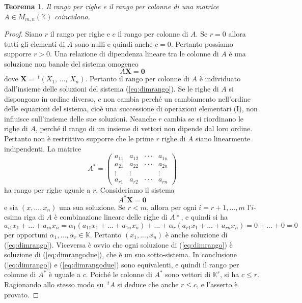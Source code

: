 \documentclass{article}
\theoremstyle{plain}
\newtheorem{thm}{Teorema}[section]
\theoremstyle{definition}
\theoremstyle{remark}
\begin{document}
\begin{bxthm}
\begin{thm}
    Il rango per righe e il rango per colonne di una matrice  $A\in M_{m,n}(\mathbb{K})$ coincidono.
\end{thm}
\end{bxthm}
\begin{proof}
    Siano $r$ il rango per righe e $c$ il rango per colonne di $A$. 
    Se $r=0$ allora tutti gli elementi di $A$ sono nulli e quindi anche $c=0$. 
    Pertanto possiamo supporre $r>0$.
    Una relazione di dipendenza lineare tra le colonne di $A$ è una soluzione non banale del sistema omogeneo
    \begin{equation}\label{eq:dimrango}
        A\mathbf{X}=\mathbf{0}
    \end{equation}
    dove $\mathbf{X}=\ ^{t}(X_{1},\,...,\,X_{n})$. Pertanto il rango per colonne di $A$ è individuato dall'insieme 
    delle soluzioni del sistema (\ref{eq:dimrango}). 
    Se le righe di $A$ si dispongono in ordine diverso, $c$ non cambia perché un cambiamento nell'ordine 
    delle equazioni del sistema, cioè una successione di operazioni elementari (I), non influisce 
    sull'insieme delle sue soluzioni. Neanche $r$ cambia se si riordinano le righe di $A$, perché il rango di 
    un insieme di vettori non dipende dal loro ordine.
    Pertanto non è restrittivo supporre che le prime $r$ righe di $A$ siano linearmente indipendenti. 
    La matrice
    \[
        A^{*}=
        \begin{pmatrix}
            a_{11}&a_{12}&\cdot\cdot\cdot&a_{1n}\\ 
            a_{21}&a_{22}&\cdot\cdot\cdot&a_{2n}\\ 
            \vdots&\vdots&&\vdots\\ 
            a_{r1}&a_{r2}&\cdot\cdot\cdot&a_{rn}
        \end{pmatrix}
    \]
    ha rango per righe uguale a $r$.
    Consideriamo il sistema 
    \begin{equation}\label{eq:dimrangodue}
        A^{*}\mathbf{X}=\mathbf{0}    
    \end{equation}
    e sia $(x,...,x_n)$ una sua soluzione. Se $r<m$, allora per ogni $i=r+1,...,m$
    l'$i$-esima riga di $A$ è combinazione lineare delle righe di $A*$, e quindi si ha
    \[a_{i1}x_1+...+a_{in}x_n = \alpha_1(a_{11}x_1 + ... + a_{1n}x_n)+ ... +\alpha_r(a_{r1}x_1 + ... + a_{rn}x_n)=0+...+0=0\]
    per opportuni $\alpha_1,..., \alpha_r \in \mathbb{K}$. 
    Pertanto $(x_1,...,x_n)$ è anche soluzione di (\ref{eq:dimrango}). 
    Viceversa è ovvio che ogni soluzione di (\ref{eq:dimrango}) è soluzione di (\ref{eq:dimrangodue}), 
    che è un suo sotto-sistema. In conclusione (\ref{eq:dimrango}) e (\ref{eq:dimrangodue}) sono equivalenti, 
    e quindi il rango per colonne di $A^*$ è uguale a $c$. 
    Poiché le colonne di $A^*$ sono vettori di $\mathbb{K}^r$, si ha $c\leq r$.
    Ragionando allo stesso modo su $\ ^{t}A$ si deduce che anche $r\leq c$, e l'asserto è provato.
\end{proof}
\end{document}
